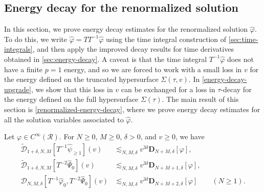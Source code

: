 \documentclass[10pt, reqno]{amsart}
\begin{document}
\subsection{Energy decay for the renormalized solution}
\label{late-time-energy}
In this section, we prove energy decay estimates for the renormalized solution
\(\widehat{\varphi{}}\). To do this, we write \(\widehat{\varphi{}} = TT^{-1}\widehat{\varphi{}}\)
using the time integral construction of \cref{sec:time-integrals}, and then apply
the improved decay results for time derivatives obtained in
\cref{sec:energy-decay}. A caveat is that the time integral \(T^{-1}\widehat{\varphi{}}\)
does not have a finite \(p=1\) energy, and so we are forced to work with a small
loss in \(v\) for the energy defined on the truncated hypersurface \(\Sigma{}(\tau{},v)\).
In \cref{energy-decay-upgrade}, we show that this loss in \(v\) can be exchanged
for a loss in \(\tau{}\)-decay for the energy defined on the full hypersurface
\(\Sigma{}(\tau{})\). The main result of this section is \cref{renormalized-energy-decay},
where we prove energy decay estimates for all the solution variables associated
to \(\widehat{\varphi{}}\).
\begin{lemma}
Let \(\varphi{}\in C^\infty(\mathcal{R})\). For \(N\ge 0\), \(M\ge
0\), \(\delta{} > 0\), and \(v\ge 0\), we have
\begin{align}
\tilde{\mathcal{D}}_{1+\delta{},N,M}[T^{-1}\widehat{\psi{}}_{\ge 1}](v) &\lesssim_{N,M,\delta{}} v^{3\delta{}}\mathbf{D}_{N+M,\delta{}}{}[\varphi{}], \label{renormalized-data-bound-prep-1}\\
\tilde{\mathcal{D}}_{1+\delta{},N,M}[T^{-2}\widehat{\Psi{}}_0](v)&\lesssim_{N,M,\delta{}}v^{3\delta{}}\mathbf{D}_{N+M+1,\delta{}}{}[\varphi{}], \\
\mathcal{D}_{N,M,\delta{}}{}[T^{-1}\widehat{\varphi{}}_0,T^{-2}\widehat{\Psi{}}_0](v) &\lesssim_{N,M,\delta{}}v^{3\delta{}}\mathbf{D}_{N+M+2,\delta{}}[\varphi{}]\qquad (N\ge 1). \label{renormalized-data-bound-prep-2}
\end{align}
\label{renormalized-data-bound}
\end{lemma}
\end{document}
